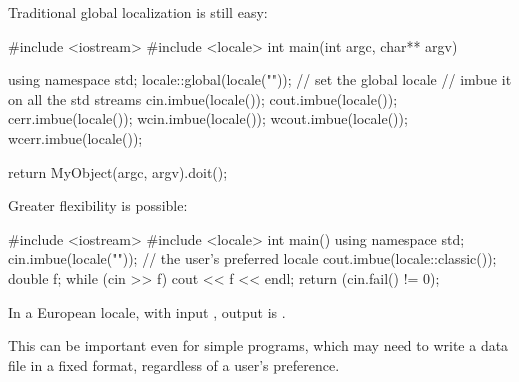 \pnum
\begin{example}
Traditional global localization is still easy:

\begin{codeblock}
#include <iostream>
#include <locale>
int main(int argc, char** argv) {
  using namespace std;
  locale::global(locale(""));           // set the global locale
                                        // imbue it on all the std streams
  cin.imbue(locale());
  cout.imbue(locale());
  cerr.imbue(locale());
  wcin.imbue(locale());
  wcout.imbue(locale());
  wcerr.imbue(locale());

  return MyObject(argc, argv).doit();
}
\end{codeblock}
\end{example}

\pnum
\begin{example}
Greater flexibility is possible:

\begin{codeblock}
#include <iostream>
#include <locale>
int main() {
  using namespace std;
  cin.imbue(locale(""));        // the user's preferred locale
  cout.imbue(locale::classic());
  double f;
  while (cin >> f) cout << f << endl;
  return (cin.fail() != 0);
}
\end{codeblock}

In a European locale, with input
,
output is
.
\end{example}

\pnum
This can be important even for simple programs, which may need to
write a data file in a fixed format, regardless of a user's preference.

